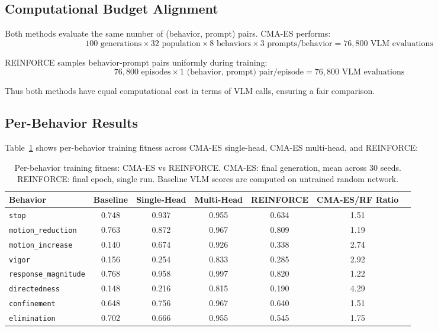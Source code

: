\documentclass{article}
\begin{document}
\subsection{Computational Budget Alignment}

Both methods evaluate the same number of (behavior, prompt) pairs. CMA-ES performs:
\begin{equation}
100 \text{ generations} \times 32 \text{ population} \times 8 \text{ behaviors} \times 3 \text{ prompts/behavior} = 76,800 \text{ VLM evaluations}
\end{equation}

REINFORCE samples behavior-prompt pairs uniformly during training:
\begin{equation}
76,800 \text{ episodes} \times 1 \text{ (behavior, prompt) pair/episode} = 76,800 \text{ VLM evaluations}
\end{equation}

Thus both methods have equal computational cost in terms of VLM calls, ensuring a fair comparison.

\subsection{Per-Behavior Results}

Table~\ref{tab:reinforce_per_behavior} shows per-behavior training fitness across CMA-ES single-head, CMA-ES multi-head, and REINFORCE:

\begin{table}[h]
\centering
\caption{Per-behavior training fitness: CMA-ES vs REINFORCE. CMA-ES: final generation, mean across 30 seeds. REINFORCE: final epoch, single run. Baseline VLM scores are computed on untrained random network.}
\label{tab:reinforce_per_behavior}
\begin{tabular}{lcccccc}
\toprule
Behavior & Baseline & Single-Head & Multi-Head & REINFORCE & CMA-ES/RF Ratio \\
\midrule
\texttt{stop}                & 0.748 & 0.937 & 0.955 & 0.634 & 1.51 \\
\texttt{motion\_reduction}   & 0.763 & 0.872 & 0.967 & 0.809 & 1.19 \\
\texttt{motion\_increase}    & 0.140 & 0.674 & 0.926 & 0.338 & 2.74 \\
\texttt{vigor}               & 0.156 & 0.254 & 0.833 & 0.285 & 2.92 \\
\texttt{response\_magnitude} & 0.768 & 0.958 & 0.997 & 0.820 & 1.22 \\
\texttt{directedness}        & 0.148 & 0.216 & 0.815 & 0.190 & 4.29 \\
\texttt{confinement}         & 0.648 & 0.756 & 0.967 & 0.640 & 1.51 \\
\texttt{elimination}         & 0.702 & 0.666 & 0.955 & 0.545 & 1.75 \\
\bottomrule
\end{tabular}
\end{table}
\end{document}
